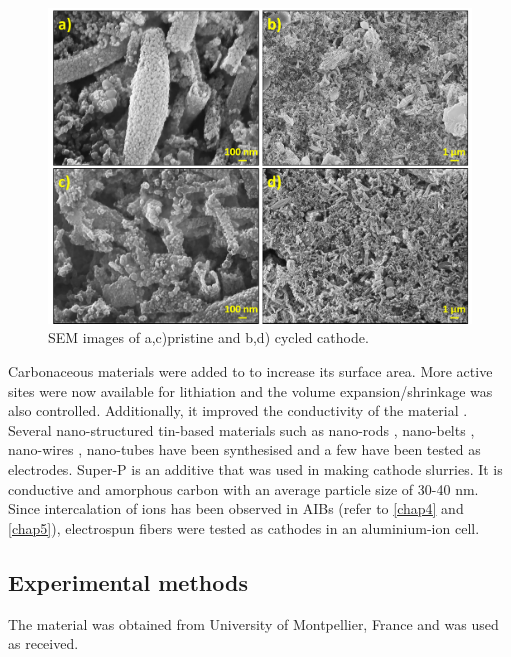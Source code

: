  \begin{figure}[th!]
  \centering
  \includegraphics[width=\textwidth]{Figures/chap6fig/SnO2SEM}
    \caption{SEM images of a,c)pristine and b,d) cycled  cathode.}
  \label{Figures/chap6fig:SnO2SEM}
\end{figure}

Carbonaceous materials were added to  to increase its surface area. More active sites were now available for lithiation and the volume expansion/shrinkage was also controlled. Additionally, it improved the conductivity of the material \cite{nowak_composites_2018}. Several nano-structured tin-based materials such as nano-rods \cite{liu_direct_2009}, nano-belts \cite{duan_single_2005}, nano-wires \cite{huang_situ_2010}, nano-tubes \cite{wang_large-scale_2011} have been synthesised and a few have been tested as electrodes. Super-P is an additive that was used in making cathode slurries. It is conductive and amorphous carbon with an average particle size of 30-40 nm. 
Since intercalation of ions has been observed in AIBs (refer to \ref{chap4} and \ref{chap5}), electrospun  fibers were tested as cathodes in an aluminium-ion cell. 

\subsection{Experimental methods}
The material was obtained from University of Montpellier, France and was used as received. 

